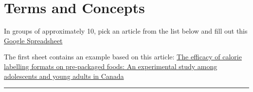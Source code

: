 \documentclass[]{book}
\theoremstyle{definition}
\theoremstyle{definition}
\theoremstyle{definition}
\theoremstyle{remark}
\begin{document}
\chapter{Terms and Concepts}\label{terms-and-concepts}

In groups of approximately 10, pick an article from the list below and
fill out this
\href{https://docs.google.com/spreadsheets/d/1Bq10eh3q8aUHuy4VWwBHVud-KAhnm31owKzc0Ie3J24/edit?usp=sharing}{Google
Spreadsheet}

The first sheet contains an example based on this article:
\href{https://www.dropbox.com/s/hg5wk5ea2bg5t5o/CalorieLabellingPackagesFoods.pdf?dl=1}{The
efficacy of calorie labelling formats on pre-packaged foods: An
experimental study among adolescents and young adults in Canada}

\begin{center}\rule{0.5\linewidth}{\linethickness}\end{center}
\end{document}
